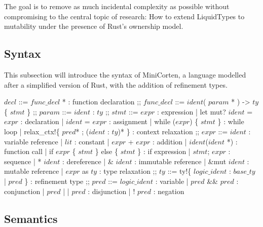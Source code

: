 \documentclass{article}
\newcommand{\ccolon}[0]{: }
\newcommand{\cmid}[0]{| }
\begin{document}
The goal is to remove as much incidental complexity as possible without compromising to the central topic of research: How to extend LiquidTypes to mutability under the presence of Rust's ownership model.

\subsection{Syntax}

This subsection will introduce the syntax of MiniCorten, a language modelled after a simplified version of Rust, with the addition of refinement types.

\begin{bnfgrammar}
  $decl$ ::=
    $func\_decl$ * : function declaration
  ;;
  $func\_decl$ ::=
    $ident$( $param$ * ) -> $ty$ \{ $stmt$ \}
  ;;
  $param$ ::= $ident$ \ccolon  $ty$
  ;;
  $stmt$ ::= 
    $expr$                                                : expression
    | let mut? $ident$ = $expr$                           : declaration
    | $ident$ = $expr$                                    : assignment
    | while ($expr$) \{ $stmt$ \}                        : while loop
    | relax\_ctx!\{ $pred$* ; ($ident$ \ccolon $ty$)* \}  : context relaxation
  ;;
  $expr$ ::=
    $ident$                                         : variable reference
    | $lit$                                         : constant
    | $expr$ + $expr$                               : addition
    | $ident$($ident$ *)                            : function call
    | if $expr$ \{ $stmt$ \} else \{ $stmt$ \}      : if expression
    | $stmt$; $expr$                                : sequence
    | * $ident$                                     : dereference
    | \& $ident$                                    : immutable reference
    | \&mut $ident$                                 : mutable reference
    | $expr$ as $ty$                                : type relaxation
  ;;
  $ty$ ::= ty!\{ $logic\_ident$ \ccolon $base\_ty$ \cmid $pred$ \} : refinement type
  ;;
  $pred$ ::=
    $logic\_ident$                      : variable
    | $pred$ \&\& $pred$        : conjunction
    | $pred$ \cmid\cmid $pred$  : disjunction
    | ! $pred$                     : negation
\end{bnfgrammar}

\subsection{Semantics}
\end{document}
